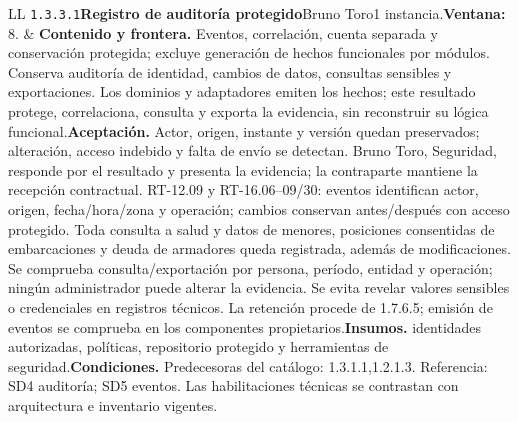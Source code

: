 \begin{longtable}{L{\tabcolsep\relax}L{\tabcolsep\relax}}
\texttt{1.\allowbreak{}3.\allowbreak{}3.\allowbreak{}1}\newline{}\textbf{Registro de auditoría protegido}\newline{}Bruno Toro\newline{}1 instancia.\newline{}\textbf{Ventana:} 8. & \textbf{Contenido y frontera.} Eventos, correlación, cuenta separada y conservación protegida; excluye generación de hechos funcionales por módulos. Conserva auditoría de identidad, cambios de datos, consultas sensibles y exportaciones. Los dominios y adaptadores emiten los hechos; este resultado protege, correlaciona, consulta y exporta la evidencia, sin reconstruir su lógica funcional.\newline{}\textbf{Aceptación.} Actor, origen, instante y versión quedan preservados; alteración, acceso indebido y falta de envío se detectan. Bruno Toro, Seguridad, responde por el resultado y presenta la evidencia; la contraparte mantiene la recepción contractual. RT-12.09 y RT-16.06--09/30: eventos identifican actor, origen, fecha/hora/zona y operación; cambios conservan antes/después con acceso protegido. Toda consulta a salud y datos de menores, posiciones consentidas de embarcaciones y deuda de armadores queda registrada, además de modificaciones. Se comprueba consulta/exportación por persona, período, entidad y operación; ningún administrador puede alterar la evidencia. Se evita revelar valores sensibles o credenciales en registros técnicos. La retención procede de 1.7.6.5; emisión de eventos se comprueba en los componentes propietarios.\newline{}\textbf{Insumos.} identidades autorizadas, políticas, repositorio protegido y herramientas de seguridad.\newline{}\textbf{Condiciones.} Predecesoras del catálogo: 1.3.1.1,1.2.1.3. Referencia: SD4 auditoría; SD5 eventos. Las habilitaciones técnicas se contrastan con arquitectura e inventario vigentes.\\\hline

\end{longtable}
